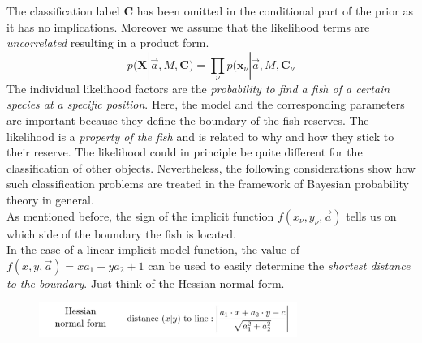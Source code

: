 \documentclass[12pt, a4paper]{scrartcl}
\begin{document}
The classification label $\boldsymbol{C}$ has been omitted in the conditional part of the prior as it has no implications. 
Moreover we assume that the likelihood terms are \textit{uncorrelated} resulting in a product form. \[p(\boldsymbol{X}|\vec{a},M,\boldsymbol{C})=\prod_{\nu}p(\boldsymbol{x}_{\nu}|\vec{a},M,\boldsymbol{C}_{\nu}\]
The individual likelihood factors are the \textit{probability to find a fish of a certain species at a specific position}.
Here, the model and the corresponding parameters are important because they define the boundary of the fish reserves.
The likelihood is a \textit{property of the fish} and is related to why and how they stick to their reserve. 
The likelihood could in principle be quite different for the classification of other objects.
Nevertheless, the following considerations show how such classification problems are treated in
the framework of Bayesian probability theory in general.\\
As mentioned before, the sign of the implicit function $f(x_{\nu},y_{\nu},\vec{a})$ tells us on which side of the boundary the fish is located. \\

In the case of a linear implicit model function, the value of $f(x,y,\vec{a})=xa_1+ya_2+1$ can be used to easily determine the \textit{shortest distance to the boundary}. Just think of the Hessian normal form.%
\begin{figure}[H]
	\centering
	\includegraphics[width=0.75\textwidth]{7_13.png}
\end{figure}
\end{document}
